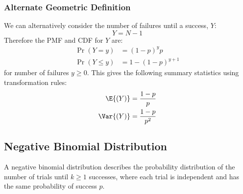 \documentclass{article}
\begin{document}
\begin{multicols}{3}
    \subsubsection{Alternate Geometric Definition}
    We can alternatively consider the number of failures until a success, \(Y\):
    \begin{equation*}
        Y = N - 1
    \end{equation*}
    Therefore the PMF and CDF for \(Y\) are:
    \begin{align*}
        \Pr{\left( Y = y \right)}    & = \left( 1 - p \right)^y p         \\
        \Pr{\left( Y \leq y \right)} & = 1 - \left( 1 - p \right)^{y + 1}
    \end{align*}
    for number of failures \(y \geq 0\). This gives the following summary statistics using
    transformation rules:
    \begin{align*}
        \E{\left( Y \right)}   & = \frac{1 - p}{p}   \\
        \Var{\left( Y \right)} & = \frac{1 - p}{p^2}
    \end{align*}
    \subsection{Negative Binomial Distribution}
    A negative binomial distribution describes the probability distribution of the number of trials until \(k \geq 1\)
    successes, where each trial is independent and has the same probability of success \(p\).


\end{multicols}
\end{document}
